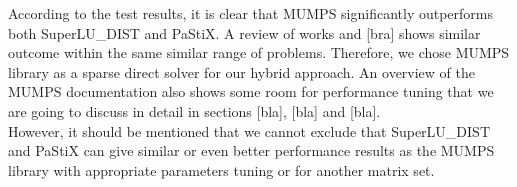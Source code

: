 







According to the test results, it is clear that MUMPS significantly outperforms both SuperLU\_DIST and  PaStiX. A review of works \cite{mm-comparison-of-packages} and [bra] shows similar outcome within the same similar range of problems. Therefore, we chose MUMPS library as a sparse direct solver for our hybrid approach. An overview of the MUMPS documentation also shows some room for performance tuning that we are going to discuss in detail in sections [bla], [bla] and  [bla].\\



However, it should be mentioned that we cannot exclude that SuperLU\_DIST  and PaStiX can give similar or even better performance results as the MUMPS library with appropriate parameters tuning or for another matrix set.\\